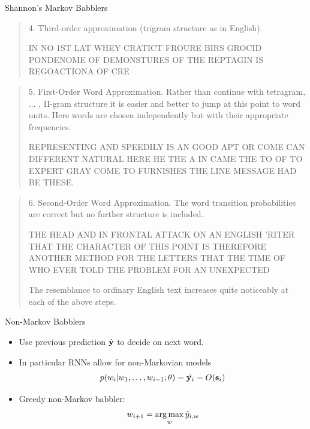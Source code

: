 \documentclass{beamer}
\begin{document}
\begin{frame}[allowframebreaks]{Shannon's Markov Babblers}

  \begin{quote}
   
  4. Third-order approximation (trigram structure as in English).

IN NO 1ST LAT WHEY CRATICT FROURE BIRS GROCID
PONDENOME OF DEMONSTURES OF THE REPTAGIN IS
REGOACTIONA OF CRE
  \end{quote}

  \begin{quote}
5. First-Order Word Approximation. Rather than continue with tetragram,
... , II-gram structure it is easier and better to jump at this
point to word units. Here words are chosen independently but with
their appropriate frequencies.

REPRESENTING AND SPEEDILY IS AN GOOD APT OR
COME CAN DIFFERENT NATURAL HERE HE THE A IN
CAME THE TO OF TO EXPERT GRAY COME TO FURNISHES
THE LINE MESSAGE HAD BE THESE.

  \end{quote}

  \begin{quote}
    6. Second-Order Word Approximation. The word transition probabilities
are correct but no further structure is included.

THE HEAD AND IN FRONTAL ATTACK ON AN ENGLISH
'RITER THAT THE CHARACTER OF THIS POINT IS
THEREFORE ANOTHER METHOD FOR THE LETTERS
THAT THE TIME OF WHO EVER TOLD THE PROBLEM
FOR AN UNEXPECTED

The resemblance to ordinary English text increases quite noticeably at
each of the above steps.

  \end{quote}
\end{frame}


\begin{frame}{Non-Markov Babblers}
  \begin{itemize}
  \item Use previous prediction $\hat{\mathbf{y}}$ to decide on next word.
    \air

  \item In particular RNNs allow for non-Markovian models
    \[ p(w_i | w_1, \ldots, w_{i-1};\theta) = \hat{\mathbf{y}_i} =  O(\mathbf{s}_i) \]

    \air 

  \item Greedy non-Markov babbler:
    \[ w_{i+1} = \argmax_{w} \hat{y}_{i,w} \]
  \end{itemize}
\end{frame}
\end{document}
